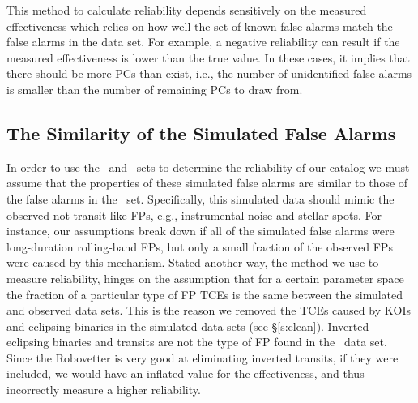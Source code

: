 This method to calculate reliability depends sensitively on the measured effectiveness which relies on how well the set of known false alarms match the false alarms in the \opstce{} data set. For example, a negative reliability can result if the measured effectiveness is lower than the true value. In these cases, it implies that there should be more PCs than exist, i.e., the number of unidentified false alarms is smaller than the number of remaining PCs to draw from.  


\subsection{The Similarity of the Simulated False Alarms}
\label{s:simularity}
In order to use the \scrtce\ and \invtce\ sets to determine the reliability of our catalog we must assume that the properties of these simulated false alarms are similar to those of the false alarms in the \opstce\ set.  Specifically, this simulated data should mimic the observed not transit-like FPs, e.g., instrumental noise and stellar spots. For instance, our assumptions break down if all of the simulated false alarms were long-duration rolling-band FPs, but only a small fraction of the observed FPs were caused by this mechanism.  Stated another way, the method we use to measure reliability, hinges on the assumption that for a certain parameter space the fraction of a particular type of FP TCEs is the same between the simulated and observed data sets.  This is the reason we removed the TCEs caused by KOIs and eclipsing binaries in the simulated data sets (see \S\ref{s:clean}). Inverted eclipsing binaries and transits are not the type of FP found in the \opstce\ data set.  Since the Robovetter is very good at eliminating inverted transits, if they were included, we would have an inflated value for the effectiveness, and thus incorrectly measure a higher reliability. 

